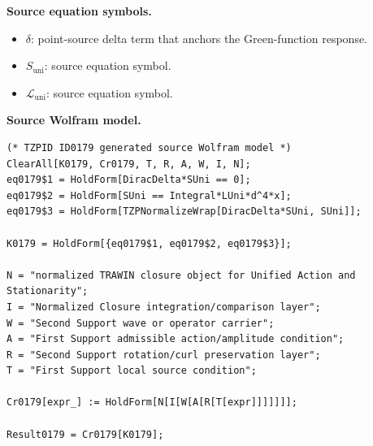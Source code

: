 \begin{minipage}[t]{0.49\linewidth}
\begingroup
\small
\raggedright
\textbf{Source equation symbols.}\par
\begin{itemize}[leftmargin=1.35em,itemsep=1pt,topsep=1pt,parsep=0pt]
    \item $\delta$: point-source delta term that anchors the Green-function response.
    \item $S_{\mathrm{uni}}$: source equation symbol.
    \item $\mathcal{L}_{\mathrm{uni}}$: source equation symbol.
\end{itemize}
\endgroup
\end{minipage}\hfill
\begin{minipage}[t]{0.47\linewidth}
\begingroup
\scriptsize
\raggedright
\textbf{Source Wolfram model.}\par
\begin{Verbatim}[fontsize=\tiny,breaklines=true,breakanywhere=true]
(* TZPID ID0179 generated source Wolfram model *)
ClearAll[K0179, Cr0179, T, R, A, W, I, N];
eq0179$1 = HoldForm[DiracDelta*SUni == 0];
eq0179$2 = HoldForm[SUni == Integral*LUni*d^4*x];
eq0179$3 = HoldForm[TZPNormalizeWrap[DiracDelta*SUni, SUni]];

K0179 = HoldForm[{eq0179$1, eq0179$2, eq0179$3}];

N = "normalized TRAWIN closure object for Unified Action and Stationarity";
I = "Normalized Closure integration/comparison layer";
W = "Second Support wave or operator carrier";
A = "First Support admissible action/amplitude condition";
R = "Second Support rotation/curl preservation layer";
T = "First Support local source condition";

Cr0179[expr_] := HoldForm[N[I[W[A[R[T[expr]]]]]]];

Result0179 = Cr0179[K0179];
\end{Verbatim}
\endgroup
\end{minipage}

